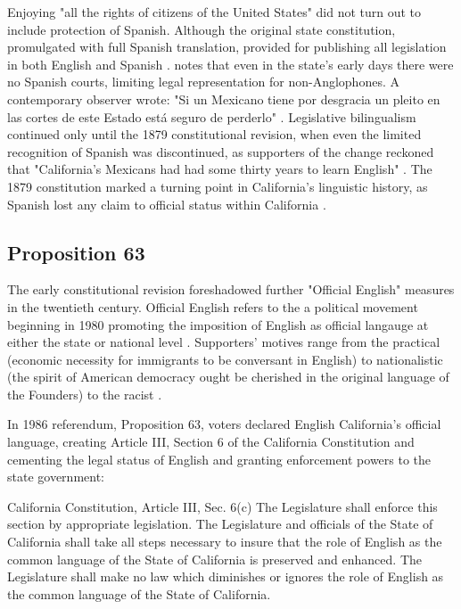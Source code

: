 Enjoying "all the rights of citizens of the United States" did not turn out to include protection of Spanish. Although the original state constitution, promulgated with full Spanish translation, provided for publishing all legislation in both English and Spanish \parencite{baron92}. \textcite{lamar-prieto14} notes that even in the state's early days there were no Spanish courts, limiting legal representation for non-Anglophones. A contemporary observer wrote: "Si un Mexicano tiene por desgracia un pleito en las cortes de este Estado está seguro de perderlo" \parencite[28]{lamar-prieto14}. Legislative bilingualism continued only until the 1879 constitutional revision, when even the limited recognition of Spanish was discontinued, as supporters of the change reckoned that "California's Mexicans had had some thirty years to learn English" \parencite[]{baron92}. The 1879 constitution marked a turning point in California's linguistic history, as Spanish lost any claim to official status within California \parencite{baron92}.

\subsection{Proposition 63}

The early constitutional revision foreshadowed further "Official English" measures in the twentieth century. Official English refers to the a political movement beginning in 1980 promoting the imposition of English as official langauge at either the state or national level \parencite{liu14}. Supporters' motives range from the practical (economic necessity for immigrants to be conversant in English) to nationalistic (the spirit of American democracy ought be cherished in the original language of the Founders) to the racist \parencite[7]{baron92}.

In 1986 referendum, Proposition 63, voters declared English California's official language, creating Article III, Section 6 of the California Constitution and cementing the legal status of English and granting enforcement powers to the state government: 

\begin{aquote}{California Constitution, Article III, Sec. 6(c)}
	The Legislature shall enforce this section by appropriate legislation. The
	Legislature and officials of the State of California shall take all steps
	necessary to insure that the role of English as the common language of the
	State of California is preserved and enhanced. The Legislature shall make no
	law which diminishes or ignores the role of English as the common language of
	the State of California. \parencite{ca-const}
\end{aquote}


